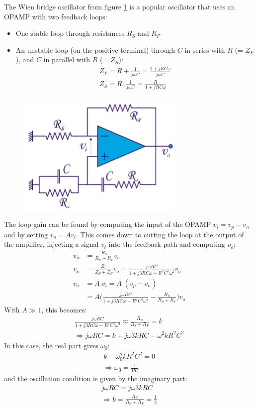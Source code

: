 The Wien bridge oscillator from figure \ref{fig:wienbridge1} is a popular oscillator that uses an OPAMP with two feedback loops:
\begin{itemize}
	\item One stable loop through resistances $R_S$ and $R_F$
	\item An unstable loop (on the positive terminal) through $C$ in series with $R$ (= $Z_F$), and $C$ in parallel with $R$ (= $Z_S$):
	\begin{align*}
		Z_F = R + \frac{1}{j\omega C} = \frac{1+ j RC \omega}{j\omega C} \\
		Z_S = R || \frac{1}{j\omega C} = \frac{R}{1+ j RC \omega}\\
	\end{align*}
\end{itemize}

\begin{figure}[h!]
	\centering
	\includegraphics[width=8cm]{figures/ch11/wienbridge1.jpg}
	\caption{}
	\label{fig:wienbridge1}
\end{figure}

The loop gain can be found by computing the input of the OPAMP $v_i = v_p - v_n$ and by setting $v_o = A v_i$. This comes down to cutting the loop at the output of the amplifier, injecting a signal $v_t$ into the feedback path and computing $v_o$:
\begin{align*}
	v_n &= \frac{R_S}{R_S + R_F} v_o\\
	v_p &= \frac{Z_S}{Z_S + Z_F} v_o = \frac{j\omega RC}{1 + j3RC\omega - R^2C^2\omega^2} v_o\\
	v_o &= A\; v_i = A\; (v_p - v_n) \\
				&= A \bigg( \frac{j\omega RC}{1 + j3RC\omega - R^2C^2\omega^2} - \frac{R_S}{R_S + R_F} \bigg) v_o
\end{align*}
With $A \gg 1$, this becomes:
\begin{align*}
	\frac{j\omega RC}{1 + j3RC\omega - R^2C^2\omega^2} \approx \frac{R_S}{R_S + R_F} = k \\
	\Rightarrow j\omega RC = k + j\omega 3kRC - \omega^2 k R^2 C^2
\end{align*}
In this case, the real part gives $\omega_0$:
\begin{align*}
	k - \omega_0^2 k R^2 C^2 = 0 \\
	\Rightarrow \omega_0 = \frac{1}{RC}
\end{align*}
and the oscillation condition is given by the imaginary part:
\begin{align*}
	j\omega RC = j\omega 3kRC \\
	\Rightarrow k = \frac{R_S}{R_S + R_F} = \frac{1}{3}
\end{align*}


